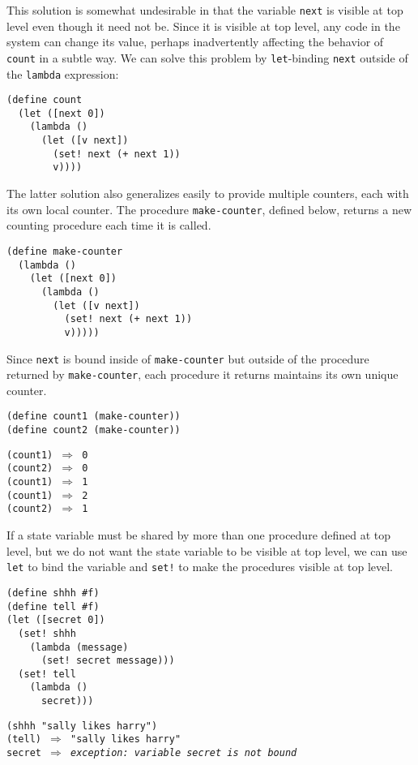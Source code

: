 This solution is somewhat undesirable in that the variable \texttt{next} is visible
at top level even though it need not be.
Since it is visible at top level, any code in the system can change its
value, perhaps inadvertently affecting the behavior of
\texttt{count} in a subtle way.
We can solve this problem by \texttt{let}-binding \texttt{next} outside of the
\texttt{lambda} expression:


\begin{alltt}
(define count
  (let ([next 0])
    (lambda ()
      (let ([v next])
        (set! next (+ next 1))
        v))))
\end{alltt}


The latter solution also generalizes easily to provide multiple counters,
each with its own local counter.
The procedure \label{start_s168}\texttt{make-counter}, defined below, returns a new counting
procedure each time it is called.


\begin{alltt}
(define make-counter
  (lambda ()
    (let ([next 0])
      (lambda ()
        (let ([v next])
          (set! next (+ next 1))
          v)))))
\end{alltt}


Since \texttt{next} is bound inside of \texttt{make-counter} but outside of
the procedure returned by \texttt{make-counter}, each procedure it returns
maintains its own unique counter.


\begin{alltt}
(define count1 (make-counter))
(define count2 (make-counter))

(count1) \(\Rightarrow\) 0
(count2) \(\Rightarrow\) 0
(count1) \(\Rightarrow\) 1
(count1) \(\Rightarrow\) 2
(count2) \(\Rightarrow\) 1
\end{alltt}


If a state variable must be shared by more than one
procedure defined at top level, but we do not want the state
variable to be visible at top level, we can use \texttt{let}
to bind the variable and \texttt{set!} to make the procedures
visible at top level.\label{start_s169}\label{start_s170}


\begin{alltt}
(define shhh \#{}f)
(define tell \#{}f)
(let ([secret 0])
  (set! shhh
    (lambda (message)
      (set! secret message)))
  (set! tell
    (lambda ()
      secret)))

(shhh "sally likes harry")
(tell) \(\Rightarrow\) "sally likes harry"
secret \(\Rightarrow\) \textit{exception: variable secret is not bound}
\end{alltt}


